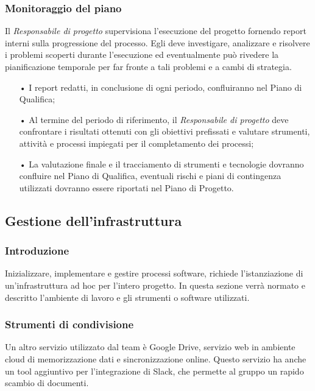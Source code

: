 \subsubsection{Monitoraggio del piano}
Il \textit{Responsabile di progetto} supervisiona l'esecuzione del progetto fornendo report interni sulla progressione del processo. 
\newline
Egli deve investigare, analizzare e risolvere i problemi scoperti durante l'esecuzione ed eventualmente può rivedere la pianificazione temporale per far fronte a tali problemi e a cambi di strategia.
\begin{itemize}
\item[•] I report redatti, in conclusione di ogni periodo, confluiranno nel Piano di Qualifica;
\item[•] Al termine del periodo di riferimento, il \textit{Responsabile di progetto} deve confrontare i risultati ottenuti 
        con gli obiettivi prefissati e valutare strumenti, attività e processi impiegati per il completamento dei processi;
\item[•] La valutazione finale e il tracciamento di strumenti e tecnologie dovranno confluire nel Piano di Qualifica,
         eventuali rischi e piani di contingenza utilizzati dovranno essere riportati nel Piano di Progetto.
\end{itemize}

\subsection{Gestione dell'infrastruttura}
    \subsubsection{Introduzione}\mbox{}
    Inizializzare, implementare e gestire processi software, richiede l’istanziazione di un’infrastruttura ad hoc per l'intero 
    progetto. In questa sezione verrà normato e descritto l'ambiente di lavoro e gli strumenti o software utilizzati.

    \subsubsection{Strumenti di condivisione}\mbox{}
    Un altro servizio utilizzato dal team è Google Drive, servizio web in {ambiente cloud} di memorizzazione dati 
    e sincronizzazione online. Questo servizio ha anche un tool aggiuntivo per l'integrazione di Slack, che permette al 
    gruppo un rapido scambio di documenti.


